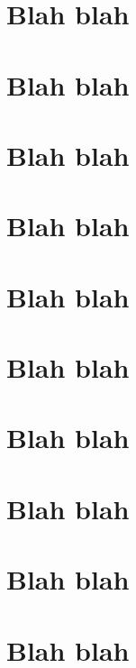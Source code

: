\documentclass{article}
\begin{document}
    \section{Blah blah}
    \clearpage
    \section{Blah blah}
    \clearpage
    \section{Blah blah}
    \clearpage
    \section{Blah blah}
    \clearpage
    \section{Blah blah}
    \clearpage
    \section{Blah blah}
    \clearpage
    \section{Blah blah}
    \clearpage
    \section{Blah blah}
    \clearpage
    \section{Blah blah}
    \clearpage
    \section{Blah blah}
\end{document}
